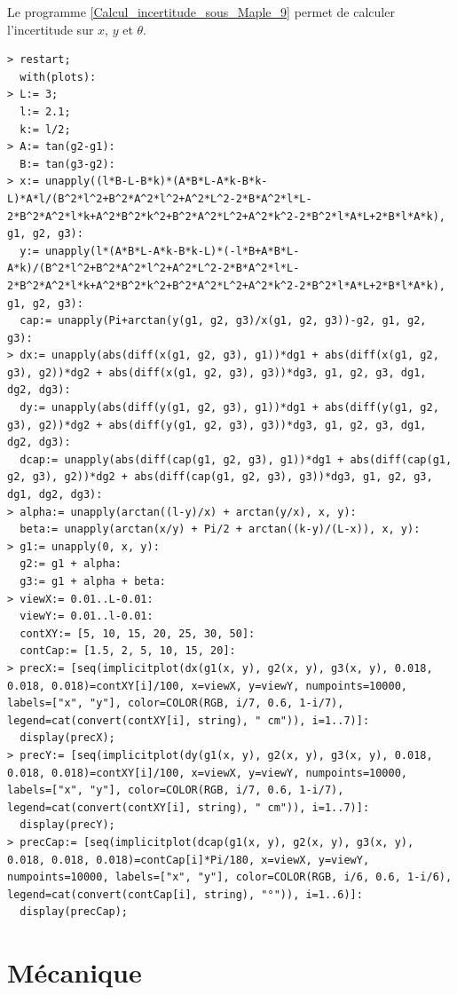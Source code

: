 \documentclass[a4paper]{article}
\begin{document}
Le programme \ref{Calcul_incertitude_sous_Maple_9} permet de calculer l'incertitude sur $x$, $y$ et $\theta$.

\begin{lstlisting}[caption=Calcul de l'incertitude sous Maple 9, label=Calcul_incertitude_sous_Maple_9]
> restart;
  with(plots):
> L:= 3;
  l:= 2.1;
  k:= l/2;
> A:= tan(g2-g1):
  B:= tan(g3-g2):
> x:= unapply((l*B-L-B*k)*(A*B*L-A*k-B*k-L)*A*l/(B^2*l^2+B^2*A^2*l^2+A^2*L^2-2*B*A^2*l*L-2*B^2*A^2*l*k+A^2*B^2*k^2+B^2*A^2*L^2+A^2*k^2-2*B^2*l*A*L+2*B*l*A*k), g1, g2, g3):
  y:= unapply(l*(A*B*L-A*k-B*k-L)*(-l*B+A*B*L-A*k)/(B^2*l^2+B^2*A^2*l^2+A^2*L^2-2*B*A^2*l*L-2*B^2*A^2*l*k+A^2*B^2*k^2+B^2*A^2*L^2+A^2*k^2-2*B^2*l*A*L+2*B*l*A*k), g1, g2, g3):
  cap:= unapply(Pi+arctan(y(g1, g2, g3)/x(g1, g2, g3))-g2, g1, g2, g3):
> dx:= unapply(abs(diff(x(g1, g2, g3), g1))*dg1 + abs(diff(x(g1, g2, g3), g2))*dg2 + abs(diff(x(g1, g2, g3), g3))*dg3, g1, g2, g3, dg1, dg2, dg3):
  dy:= unapply(abs(diff(y(g1, g2, g3), g1))*dg1 + abs(diff(y(g1, g2, g3), g2))*dg2 + abs(diff(y(g1, g2, g3), g3))*dg3, g1, g2, g3, dg1, dg2, dg3):
  dcap:= unapply(abs(diff(cap(g1, g2, g3), g1))*dg1 + abs(diff(cap(g1, g2, g3), g2))*dg2 + abs(diff(cap(g1, g2, g3), g3))*dg3, g1, g2, g3, dg1, dg2, dg3):
> alpha:= unapply(arctan((l-y)/x) + arctan(y/x), x, y):
  beta:= unapply(arctan(x/y) + Pi/2 + arctan((k-y)/(L-x)), x, y):
> g1:= unapply(0, x, y):
  g2:= g1 + alpha:
  g3:= g1 + alpha + beta:
> viewX:= 0.01..L-0.01:
  viewY:= 0.01..l-0.01:
  contXY:= [5, 10, 15, 20, 25, 30, 50]:
  contCap:= [1.5, 2, 5, 10, 15, 20]:
> precX:= [seq(implicitplot(dx(g1(x, y), g2(x, y), g3(x, y), 0.018, 0.018, 0.018)=contXY[i]/100, x=viewX, y=viewY, numpoints=10000, labels=["x", "y"], color=COLOR(RGB, i/7, 0.6, 1-i/7), legend=cat(convert(contXY[i], string), " cm")), i=1..7)]:
  display(precX);
> precY:= [seq(implicitplot(dy(g1(x, y), g2(x, y), g3(x, y), 0.018, 0.018, 0.018)=contXY[i]/100, x=viewX, y=viewY, numpoints=10000, labels=["x", "y"], color=COLOR(RGB, i/7, 0.6, 1-i/7), legend=cat(convert(contXY[i], string), " cm")), i=1..7)]:
  display(precY);
> precCap:= [seq(implicitplot(dcap(g1(x, y), g2(x, y), g3(x, y), 0.018, 0.018, 0.018)=contCap[i]*Pi/180, x=viewX, y=viewY, numpoints=10000, labels=["x", "y"], color=COLOR(RGB, i/6, 0.6, 1-i/6), legend=cat(convert(contCap[i], string), "°")), i=1..6)]:
  display(precCap);
\end{lstlisting}

\newpage
\part{Mécanique}
\end{document}
